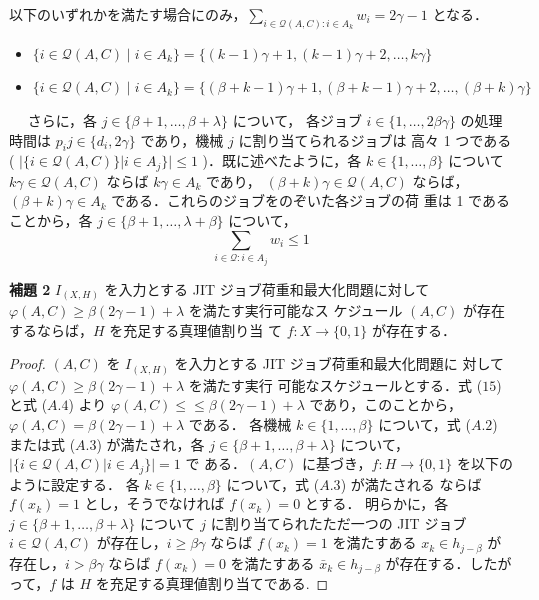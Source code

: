\documentclass[12pt]{optlab-bachelor}
\begin{document}
以下のいずれかを満たす場合にのみ，$\displaystyle \sum_{i \in \mathcal{Q}(A,C):i \in A_k}w_i =
2\gamma - 1$ となる．
\begin{itemize}
  \item $\{i \in \mathcal{Q}(A,C) \mid i \in A_k\} = \{(k - 1)\gamma + 1, (k
  - 1)\gamma + 2,\ldots,k\gamma\} \label{A.2}$
  \item $\{i \in \mathcal{Q}(A,C) \mid i \in A_k\} = \{(\beta + k -
  1)\gamma + 1, (\beta + k
  - 1)\gamma + 2,\ldots,(\beta + k)\gamma\} \label{A.3}$
  \end{itemize}　
  さらに，各 $j \in \{\beta + 1,\ldots, \beta + \lambda \}$ について，
  各ジョブ $i \in \{1,\ldots, 2\beta \gamma \}$ の処理時間は $p_ij
  \in \{d_i, 2\gamma \}$ であり，機械 $j$ に割り当てられるジョブは
  高々 1 つである ( $|\{i \in \mathcal{Q}(A, C)\} | i \in A_j \}| \le 1$
  )．既に述べたように，各 $k \in \{1,\ldots,\beta \}$ について
  $k\gamma \in \mathcal{Q}(A,C)$ ならば $k\gamma \in A_k$ であり，
  $(\beta + k) \gamma \in \mathcal{Q}(A,C)$ ならば，$(\beta +
  k)\gamma \in A_k$ である．これらのジョブをのぞいた各ジョブの荷
  重は 1 であることから，各 $j \in \{ \beta + 1,\ldots,
  \lambda + \beta \}$ について，
  $$\displaystyle \sum_{i \in \mathcal{Q}:i \in A_j}w_i \le 1 \label{A.4}$$

  \noindent \textbf{補題 2}
  $I_{(X,H)}$ を入力とする JIT ジョブ荷重和最大化問題に対して
  $\varphi(A, C) \ge \beta(2\gamma − 1) + \lambda$ を満たす実行可能なス
  ケジュール $(A, C)$ が存在するならば，$H$ を充足する真理値割り当
  て $f : X \to \{0, 1\}$ が存在する．

  \begin{proof}
    $(A, C)$ を $I_{(X,H)}$ を入力とする JIT ジョブ荷重和最大化問題に
    対して $\varphi(A, C) \ge \beta (2\gamma − 1) + \lambda$ を満たす実行
    可能なスケジュールとする．式 ($15$) と式 ($A.4$) より $\varphi(A, C
    )\le≤ \beta(2\gamma − 1) + \lambda$ であり，このことから，
    $\varphi(A, C) = \beta (2\gamma − 1) + \lambda$ である．
    各機械 $k \in \{1,\ldots, \beta\}$ について，式 ($A.2$) または式
    ($A.3$) が満たされ，各 $j \in \{ \beta + 1,\ldots,\beta + \lambda
    \}$ について，$|\{ i \in \mathcal{Q}(A,C) | i \in A_j \} | = 1$ で
    ある．$(A,C)$ に基づき，$f : H \to \{0,1\}$ を以下のように設定する．
    各 $k \in \{1,\ldots, \beta \}$ について，式 ($A.3$) が満たされる
    ならば $f(x_k) = 1$ とし，そうでなければ $f(x_k) = 0$ とする．
    明らかに，各 $j \in \{\beta + 1,\ldots,\beta + \lambda \}$ について
    $j$ に割り当てられたただ一つの JIT ジョブ $i \in
    \mathcal{Q}(A,C)$ が存在し，$i \ge \beta \gamma$ ならば $f(x_k)
    = 1$ を満たすある $x_k \in h_{j - \beta}$ が存在し，$i > \beta
    \gamma$ ならば $f(x_k) = 0$ を満たすある $\bar x_k \in h_{j -
    \beta}$ が存在する．したがって，$f$ は $H$ を充足する真理値割り当てである.
  \end{proof}
\end{document}
